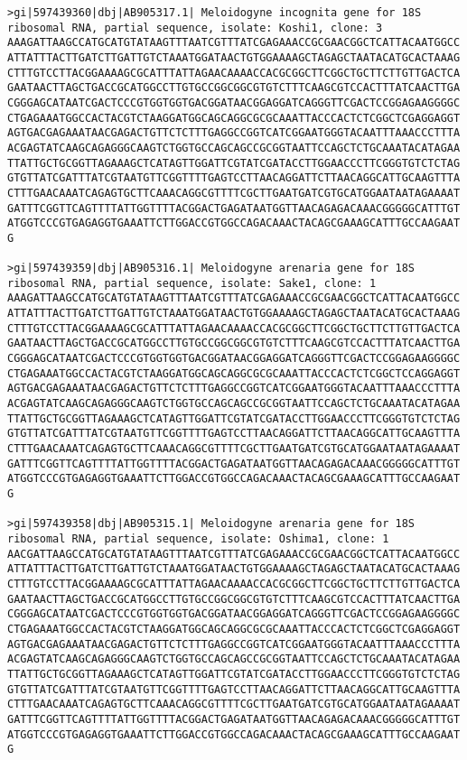 \documentclass[11pt]{article}
\begin{document}
\begin{Verbatim}[commandchars=\\\{\}]
>gi|597439360|dbj|AB905317.1| Meloidogyne incognita gene for 18S ribosomal RNA, partial sequence, isolate: Koshi1, clone: 3
AAAGATTAAGCCATGCATGTATAAGTTTAATCGTTTATCGAGAAACCGCGAACGGCTCATTACAATGGCC
ATTATTTACTTGATCTTGATTGTCTAAATGGATAACTGTGGAAAAGCTAGAGCTAATACATGCACTAAAG
CTTTGTCCTTACGGAAAAGCGCATTTATTAGAACAAAACCACGCGGCTTCGGCTGCTTCTTGTTGACTCA
GAATAACTTAGCTGACCGCATGGCCTTGTGCCGGCGGCGTGTCTTTCAAGCGTCCACTTTATCAACTTGA
CGGGAGCATAATCGACTCCCGTGGTGGTGACGGATAACGGAGGATCAGGGTTCGACTCCGGAGAAGGGGC
CTGAGAAATGGCCACTACGTCTAAGGATGGCAGCAGGCGCGCAAATTACCCACTCTCGGCTCGAGGAGGT
AGTGACGAGAAATAACGAGACTGTTCTCTTTGAGGCCGGTCATCGGAATGGGTACAATTTAAACCCTTTA
ACGAGTATCAAGCAGAGGGCAAGTCTGGTGCCAGCAGCCGCGGTAATTCCAGCTCTGCAAATACATAGAA
TTATTGCTGCGGTTAGAAAGCTCATAGTTGGATTCGTATCGATACCTTGGAACCCTTCGGGTGTCTCTAG
GTGTTATCGATTTATCGTAATGTTCGGTTTTGAGTCCTTAACAGGATTCTTAACAGGCATTGCAAGTTTA
CTTTGAACAAATCAGAGTGCTTCAAACAGGCGTTTTCGCTTGAATGATCGTGCATGGAATAATAGAAAAT
GATTTCGGTTCAGTTTTATTGGTTTTACGGACTGAGATAATGGTTAACAGAGACAAACGGGGGCATTTGT
ATGGTCCCGTGAGAGGTGAAATTCTTGGACCGTGGCCAGACAAACTACAGCGAAAGCATTTGCCAAGAAT
G

>gi|597439359|dbj|AB905316.1| Meloidogyne arenaria gene for 18S ribosomal RNA, partial sequence, isolate: Sake1, clone: 1
AAAGATTAAGCCATGCATGTATAAGTTTAATCGTTTATCGAGAAACCGCGAACGGCTCATTACAATGGCC
ATTATTTACTTGATCTTGATTGTCTAAATGGATAACTGTGGAAAAGCTAGAGCTAATACATGCACTAAAG
CTTTGTCCTTACGGAAAAGCGCATTTATTAGAACAAAACCACGCGGCTTCGGCTGCTTCTTGTTGACTCA
GAATAACTTAGCTGACCGCATGGCCTTGTGCCGGCGGCGTGTCTTTCAAGCGTCCACTTTATCAACTTGA
CGGGAGCATAATCGACTCCCGTGGTGGTGACGGATAACGGAGGATCAGGGTTCGACTCCGGAGAAGGGGC
CTGAGAAATGGCCACTACGTCTAAGGATGGCAGCAGGCGCGCAAATTACCCACTCTCGGCTCCAGGAGGT
AGTGACGAGAAATAACGAGACTGTTCTCTTTGAGGCCGGTCATCGGAATGGGTACAATTTAAACCCTTTA
ACGAGTATCAAGCAGAGGGCAAGTCTGGTGCCAGCAGCCGCGGTAATTCCAGCTCTGCAAATACATAGAA
TTATTGCTGCGGTTAGAAAGCTCATAGTTGGATTCGTATCGATACCTTGGAACCCTTCGGGTGTCTCTAG
GTGTTATCGATTTATCGTAATGTTCGGTTTTGAGTCCTTAACAGGATTCTTAACAGGCATTGCAAGTTTA
CTTTGAACAAATCAGAGTGCTTCAAACAGGCGTTTTCGCTTGAATGATCGTGCATGGAATAATAGAAAAT
GATTTCGGTTCAGTTTTATTGGTTTTACGGACTGAGATAATGGTTAACAGAGACAAACGGGGGCATTTGT
ATGGTCCCGTGAGAGGTGAAATTCTTGGACCGTGGCCAGACAAACTACAGCGAAAGCATTTGCCAAGAAT
G

>gi|597439358|dbj|AB905315.1| Meloidogyne arenaria gene for 18S ribosomal RNA, partial sequence, isolate: Oshima1, clone: 1
AACGATTAAGCCATGCATGTATAAGTTTAATCGTTTATCGAGAAACCGCGAACGGCTCATTACAATGGCC
ATTATTTACTTGATCTTGATTGTCTAAATGGATAACTGTGGAAAAGCTAGAGCTAATACATGCACTAAAG
CTTTGTCCTTACGGAAAAGCGCATTTATTAGAACAAAACCACGCGGCTTCGGCTGCTTCTTGTTGACTCA
GAATAACTTAGCTGACCGCATGGCCTTGTGCCGGCGGCGTGTCTTTCAAGCGTCCACTTTATCAACTTGA
CGGGAGCATAATCGACTCCCGTGGTGGTGACGGATAACGGAGGATCAGGGTTCGACTCCGGAGAAGGGGC
CTGAGAAATGGCCACTACGTCTAAGGATGGCAGCAGGCGCGCAAATTACCCACTCTCGGCTCGAGGAGGT
AGTGACGAGAAATAACGAGACTGTTCTCTTTGAGGCCGGTCATCGGAATGGGTACAATTTAAACCCTTTA
ACGAGTATCAAGCAGAGGGCAAGTCTGGTGCCAGCAGCCGCGGTAATTCCAGCTCTGCAAATACATAGAA
TTATTGCTGCGGTTAGAAAGCTCATAGTTGGATTCGTATCGATACCTTGGAACCCTTCGGGTGTCTCTAG
GTGTTATCGATTTATCGTAATGTTCGGTTTTGAGTCCTTAACAGGATTCTTAACAGGCATTGCAAGTTTA
CTTTGAACAAATCAGAGTGCTTCAAACAGGCGTTTTCGCTTGAATGATCGTGCATGGAATAATAGAAAAT
GATTTCGGTTCAGTTTTATTGGTTTTACGGACTGAGATAATGGTTAACAGAGACAAACGGGGGCATTTGT
ATGGTCCCGTGAGAGGTGAAATTCTTGGACCGTGGCCAGACAAACTACAGCGAAAGCATTTGCCAAGAAT
G


\end{Verbatim}
\end{document}
